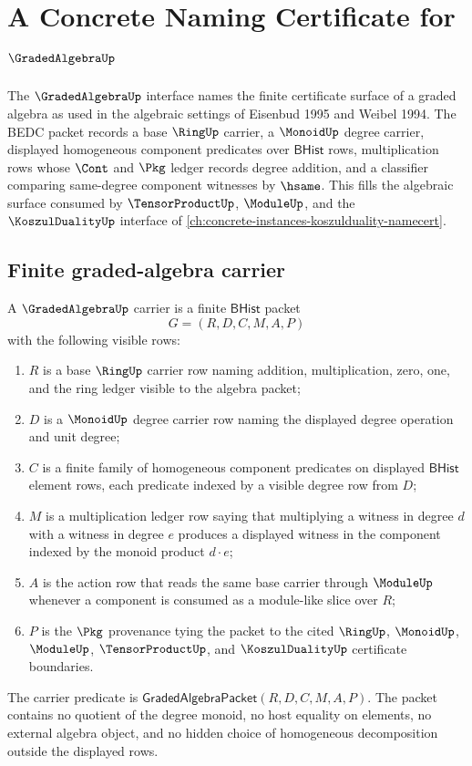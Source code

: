 \chapter{A Concrete Naming Certificate for $\GradedAlgebraUp$}
\label{ch:concrete-instances-gradedalgebra-namecert}

The $\GradedAlgebraUp$ interface names the finite certificate surface of a graded algebra as used in the algebraic settings of Eisenbud 1995 and Weibel 1994. The BEDC packet records a base $\RingUp$ carrier, a $\MonoidUp$ degree carrier, displayed homogeneous component predicates over $\mathsf{BHist}$ rows, multiplication rows whose $\Cont$ and $\Pkg$ ledger records degree addition, and a classifier comparing same-degree component witnesses by $\hsame$. This fills the algebraic surface consumed by $\TensorProductUp$, $\ModuleUp$, and the $\KoszulDualityUp$ interface of \autoref{ch:concrete-instances-koszulduality-namecert}.

\section{Finite graded-algebra carrier}
\label{sec:gradedalgebra-finite-carrier}

\begin{definition}
\label{def:gradedalgebra-bhist-carrier}
A $\GradedAlgebraUp$ carrier is a finite $\mathsf{BHist}$ packet
$$
G=(R,D,C,M,A,P)
$$
with the following visible rows:
\begin{enumerate}
\item $R$ is a base $\RingUp$ carrier row naming addition, multiplication, zero, one, and the ring ledger visible to the algebra packet;
\item $D$ is a $\MonoidUp$ degree carrier row naming the displayed degree operation and unit degree;
\item $C$ is a finite family of homogeneous component predicates on displayed $\mathsf{BHist}$ element rows, each predicate indexed by a visible degree row from $D$;
\item $M$ is a multiplication ledger row saying that multiplying a witness in degree $d$ with a witness in degree $e$ produces a displayed witness in the component indexed by the monoid product $d\cdot e$;
\item $A$ is the action row that reads the same base carrier through $\ModuleUp$ whenever a component is consumed as a module-like slice over $R$;
\item $P$ is the $\Pkg$ provenance tying the packet to the cited $\RingUp$, $\MonoidUp$, $\ModuleUp$, $\TensorProductUp$, and $\KoszulDualityUp$ certificate boundaries.
\end{enumerate}
The carrier predicate is $\mathsf{GradedAlgebraPacket}(R,D,C,M,A,P)$. The packet contains no quotient of the degree monoid, no host equality on elements, no external algebra object, and no hidden choice of homogeneous decomposition outside the displayed rows.
\end{definition}

